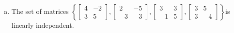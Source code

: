 \begin{exerciseAnswer}
\begin{enumerate}[(a)]
\item The set of matrices \( \left\{ \left[\begin{array}{cc}
4 & -2 \\
3 & 5
\end{array}\right] , \left[\begin{array}{cc}
2 & -5 \\
-3 & -3
\end{array}\right] , \left[\begin{array}{cc}
3 & 3 \\
-1 & 5
\end{array}\right] , \left[\begin{array}{cc}
3 & 5 \\
3 & -4
\end{array}\right] \right\} \)is linearly independent.
\end{enumerate}
    
\end{exerciseAnswer}
    
